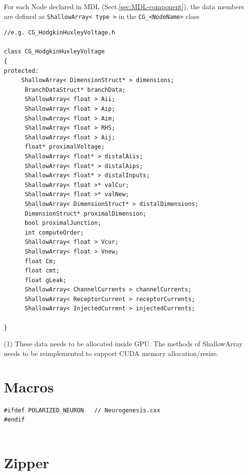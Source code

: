 For each Node declared in MDL (Sect.\ref{sec:MDL-component}), the data members
are defined as \verb!ShallowArray< type >! in the \verb!CG_<NodeName>! class
\begin{verbatim}
//e.g. CG_HodgkinHuxleyVoltage.h

class CG_HodgkinHuxleyVoltage
{
protected:
     ShallowArray< DimensionStruct* > dimensions;
      BranchDataStruct* branchData;
      ShallowArray< float > Aii;
      ShallowArray< float > Aip;
      ShallowArray< float > Aim;
      ShallowArray< float > RHS;
      ShallowArray< float > Aij;
      float* proximalVoltage;
      ShallowArray< float* > distalAiis;
      ShallowArray< float* > distalAips;
      ShallowArray< float* > distalInputs;
      ShallowArray< float >* valCur;
      ShallowArray< float >* valNew;
      ShallowArray< DimensionStruct* > distalDimensions;
      DimensionStruct* proximalDimension;
      bool proximalJunction;
      int computeOrder;
      ShallowArray< float > Vcur;
      ShallowArray< float > Vnew;
      float Cm;
      float cmt;
      float gLeak;
      ShallowArray< ChannelCurrents > channelCurrents;
      ShallowArray< ReceptorCurrent > receptorCurrents;
      ShallowArray< InjectedCurrent > injectedCurrents;

}

\end{verbatim}

(1) These data needs to be allocated inside GPU. The methods of ShallowArray
needs to be reimplemented to support CUDA memory allocation/resize.

\section{Macros}

\begin{verbatim}
#ifdef POLARIZED_NEURON   // Neurogenesis.cxx
#endif


\end{verbatim}

\section{Zipper}
\label{sec:NTS-Zipper}
\label{sec:Zipper-NTS}


